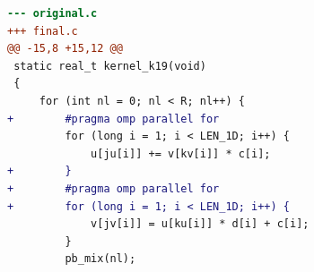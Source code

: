 \begin{lstlisting}[language=diff,basicstyle=\ttfamily\scriptsize,breaklines=true,caption={tsvc_b1/k19 — BROKEN (e2v3_k19)}]
--- original.c
+++ final.c
@@ -15,8 +15,12 @@
 static real_t kernel_k19(void)
 {
     for (int nl = 0; nl < R; nl++) {
+        #pragma omp parallel for 
         for (long i = 1; i < LEN_1D; i++) {
             u[ju[i]] += v[kv[i]] * c[i];
+        }
+        #pragma omp parallel for 
+        for (long i = 1; i < LEN_1D; i++) {
             v[jv[i]] = u[ku[i]] * d[i] + c[i];
         }
         pb_mix(nl);
\end{lstlisting}
